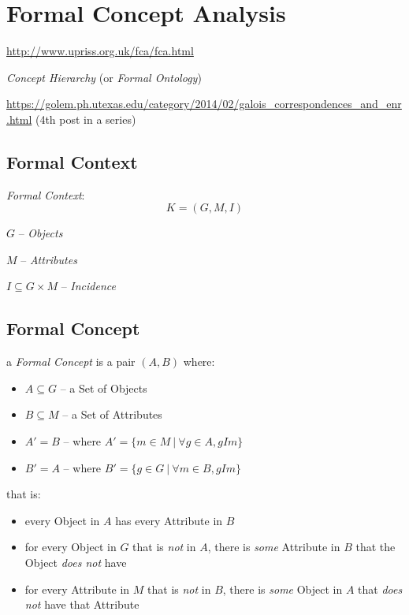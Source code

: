 \section{Formal Concept Analysis}\label{sec:fca}


\url{http://www.upriss.org.uk/fca/fca.html}

\emph{Concept Hierarchy} (or \emph{Formal Ontology})

\url{https://golem.ph.utexas.edu/category/2014/02/galois_correspondences_and_enr.html}
(4th post in a series)



\subsection{Formal Context}\label{sec:formal_context}

\emph{Formal Context}:
\[
  K = (G,M,I)
\]

$G$ -- \emph{Objects}

$M$ -- \emph{Attributes}

$I \subseteq G \times M$ -- \emph{Incidence}



\subsection{Formal Concept}\label{sec:formal_concept}

a \emph{Formal Concept} is a pair $(A,B)$ where:
\begin{itemize}
  \item $A \subseteq G$ -- a Set of Objects
  \item $B \subseteq M$ -- a Set of Attributes
  \item $A' = B$ -- where $A' = \{ m \in M \ |\ \forall g \in A, gIm \}$
  \item $B' = A$ -- where $B' = \{ g \in G \ |\ \forall m \in B, gIm \}$
\end{itemize}
that is:
\begin{itemize}
  \item every Object in $A$ has every Attribute in $B$
  \item for every Object in $G$ that is \emph{not} in $A$, there is
    \emph{some} Attribute in $B$ that the Object \emph{does not} have
  \item for every Attribute in $M$ that is \emph{not} in $B$, there is
    \emph{some} Object in $A$ that \emph{does not} have that Attribute
\end{itemize}

